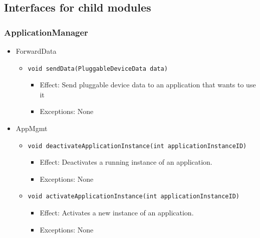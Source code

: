 \subsection{Interfaces for child modules}
    \subsubsection{ApplicationManager}
    \begin{itemize}
        \item ForwardData
        \begin{itemize}
            \item \texttt{void sendData(PluggableDeviceData data)}
            \begin{itemize}
                \item Effect: Send pluggable device data to an application that wants to use it
                \item Exceptions: None
            \end{itemize}
        \end{itemize}
        \item AppMgmt
        \begin{itemize}
            \item \texttt{void deactivateApplicationInstance(int applicationInstanceID)}
            \begin{itemize}
                \item Effect: Deactivates a running instance of an application.
                \item Exceptions: None
            \end{itemize}
            \item \texttt{void activateApplicationInstance(int applicationInstanceID)}
            \begin{itemize}
                \item Effect: Activates a new instance of an application.
                \item Exceptions: None
            \end{itemize}
        \end{itemize}
    \end{itemize}

